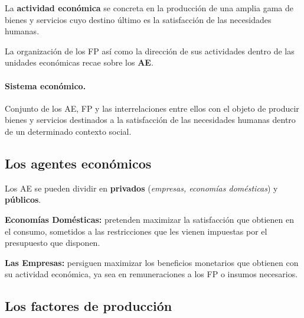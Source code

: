 \documentclass[10pt,a4paper]{article}
\begin{document}
La \textbf{actividad económica} se concreta en la producción de una amplia gama de bienes y servicios cuyo destino último es la satisfacción de las necesidades humanas.

La organización de los FP así como la dirección de sus actividades dentro de las unidades económicas recae sobre los \textbf{AE}.

\paragraph{Sistema económico.}
Conjunto de los AE, FP y las interrelaciones entre ellos con el objeto de producir bienes y servicios destinados a la satisfacción de las necesidades humanas dentro de un determinado contexto social.

\subsection{Los agentes económicos}

Los AE se pueden dividir en \textbf{privados} (\textit{empresas, economías domésticas}) y \textbf{públicos}.

\begin{description}
\item \textbf{Economías Domésticas:} pretenden maximizar la satisfacción que obtienen en el consumo, sometidos a las restricciones que les vienen impuestas por el presupuesto que disponen.
\item \textbf{Las Empresas:} persiguen maximizar los beneficios monetarios que obtienen con su actividad económica, ya sea en remuneraciones a los FP o insumos necesarios.
\end{description}

\subsection{Los factores de producción}
\end{document}

